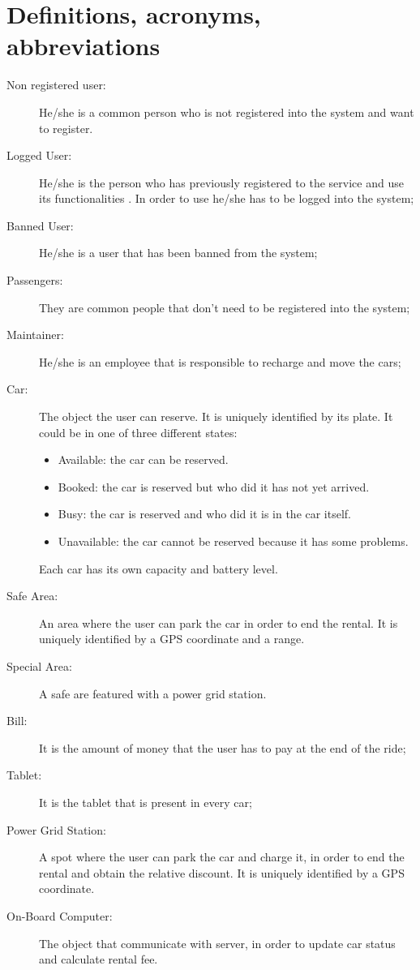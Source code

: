 \section{Definitions, acronyms, abbreviations}
\begin{description}
    \item[Non registered user:] He/she is a common person who is not registered into the system and want to register.
	\item [Logged User:] He/she is the person who has previously registered to the service and use its functionalities . In order to use he/she has to be logged into the system;
	\item[Banned User:] He/she is a user that has been banned from the system;
	\item[Passengers:] They are common people that don't need to be registered into the system;
	\item[Maintainer:] He/she is an employee that is responsible to recharge and move the cars;
	\item [Car:] The object the user can reserve. It is uniquely identified by its plate. It could be in one of three different states:
	\begin{itemize}
		\item Available: the car can be reserved.
		\item Booked: the car is reserved but who did it has not yet arrived.
		\item Busy: the car is reserved and who did it is in the car itself.
		\item Unavailable: the car cannot be reserved because it has some problems.
	\end{itemize}
	Each car has its own capacity and battery level.
	\item [Safe Area:] An area where the user can park the car in order to end the rental. It is uniquely identified by a GPS coordinate and a range.
	\item[Special Area:] A safe are featured with a power grid station.
	\item[Bill:] It is the amount of money that the user has to pay at the end of the ride;
	\item[Tablet:] It is the tablet that is present in every car;
	\item [Power Grid Station:] A spot where the user can park the car and charge it, in order to end the rental and obtain the relative discount. It is uniquely identified by a GPS coordinate.
	\item [On-Board Computer:] The object that communicate with server, in order to update car status and calculate rental fee.

\end{description}
